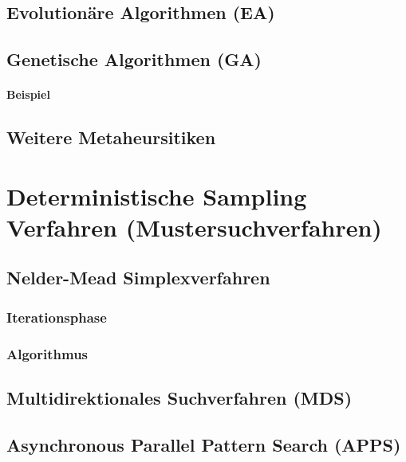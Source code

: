 		\subsection{Evolutionäre Algorithmen (EA)} %

		\subsection{Genetische Algorithmen (GA)} %

			\paragraph{Beispiel} %

		\subsection{Weitere Metaheursitiken} %

	\section{Deterministische Sampling Verfahren (Mustersuchverfahren)} %

		\subsection{Nelder-Mead Simplexverfahren} %

			\subsubsection{Iterationsphase} %

			\subsubsection{Algorithmus} %

		\subsection{Multidirektionales Suchverfahren (MDS)} %

		\subsection{Asynchronous Parallel Pattern Search (APPS)} %


